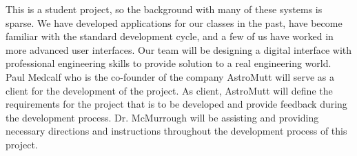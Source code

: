 This is a student project, so the background with many of these systems is sparse. We have developed applications for our classes in the past, have become familiar with the standard development cycle, and a few of us have worked in more advanced user interfaces. Our team will be designing a digital interface with professional engineering skills to provide solution to a real engineering world. Paul Medcalf who is the co-founder of the company AstroMutt will serve as a client for the development of the project. As client, AstroMutt will define the requirements for the project that is to be developed and provide feedback during the development process. Dr. McMurrough will be assisting and providing necessary directions and instructions throughout the development process of this project. 
